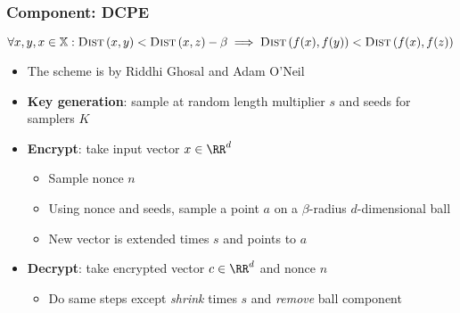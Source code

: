 	\begin{frame}[label={frame:appendix:dcpe}]

		\frametitle{Component: DCPE}

		\[
			\forall x, y, x \in \mathbb{X} : \algo{Dist}{x, y} < \algo{Dist}{x, z} - \beta \implies \algo{Dist}{f(x), f(y)} < \algo{Dist}{f(x), f(z)}
		\]

		\begin{itemize}
			\item<1->
				The scheme is by Riddhi Ghosal and Adam O'Neil
			\item<2->
				\textbf{Key generation}: sample at random length multiplier $s$ and seeds for samplers $K$
			\item<3->
				\textbf{Encrypt}: take input vector $x \in \RR^d$
				\begin{itemize}
					\item Sample nonce $n$
					\item Using nonce and seeds, sample a point $a$ on a $\beta$-radius $d$-dimensional ball
					\item New vector is extended times $s$ and points to $a$
				\end{itemize}
			\item<4->
				\textbf{Decrypt}: take encrypted vector $c \in \RR^d$ and nonce $n$
				\begin{itemize}
					\item Do same steps except \emph{shrink} times $s$ and \emph{remove} ball component
				\end{itemize}
		\end{itemize}

		\hyperlink{frame:knn}{}

	\end{frame}

